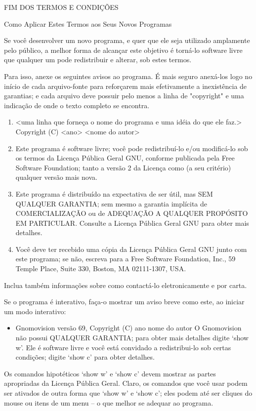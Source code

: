 {\begin{center}
		      FIM DOS TERMOS E CONDIÇÕES

	  Como Aplicar Estes Termos aos Seus Novos Programas
\end{center}

  Se você desenvolver um novo programa, e quer que ele seja utilizado
amplamente pelo público, a melhor forma de alcançar este objetivo é
torná-lo software livre que qualquer um pode redistribuir e alterar,
sob estes termos.

  Para isso, anexe os seguintes avisos ao programa. É mais seguro
anexá-los logo no início de cada arquivo-fonte para reforçarem mais
efetivamente a inexistência de garantias; e cada arquivo deve possuir
pelo menos a linha de "copyright" e uma indicação de onde o texto
completo se encontra.

\begin{enumerate}
    \item <uma linha que forneça o nome do programa e uma idéia do que ele faz.>
    Copyright (C) <ano>  <nome do autor>
   
    \item Este programa é software livre; você pode redistribuí-lo e/ou
    modificá-lo sob os termos da Licença Pública Geral GNU, conforme
    publicada pela Free Software Foundation; tanto a versão 2 da
    Licença como (a seu critério) qualquer versão mais nova.

    \item Este programa é distribuído na expectativa de ser útil, mas SEM
    QUALQUER GARANTIA; sem mesmo a garantia implícita de
    COMERCIALIZAÇÃO ou de ADEQUAÇÃO A QUALQUER PROPÓSITO EM
    PARTICULAR. Consulte a Licença Pública Geral GNU para obter mais
    detalhes.
 
    \item Você deve ter recebido uma cópia da Licença Pública Geral GNU
    junto com este programa; se não, escreva para a Free Software
    Foundation, Inc., 59 Temple Place, Suite 330, Boston, MA
    02111-1307, USA.
\end{enumerate}

Inclua também informações sobre como contactá-lo eletronicamente e por
carta.

Se o programa é interativo, faça-o mostrar um aviso breve como este,
ao iniciar um modo interativo:
\begin{itemize}
    \item Gnomovision versão 69, Copyright (C) ano nome do autor
    O Gnomovision não possui QUALQUER GARANTIA; para obter mais
    detalhes digite `show w'. Ele é software livre e você está
    convidado a redistribui-lo sob certas condições; digite `show c'
    para obter detalhes.
\end{itemize}
Os comandos hipotéticos `show w' e `show c' devem mostrar as partes
apropriadas da Licença Pública Geral. Claro, os comandos que você usar
podem ser ativados de outra forma que `show w' e `show c'; eles podem
até ser cliques do mouse ou itens de um menu -- o que melhor se
adequar ao programa.

}

